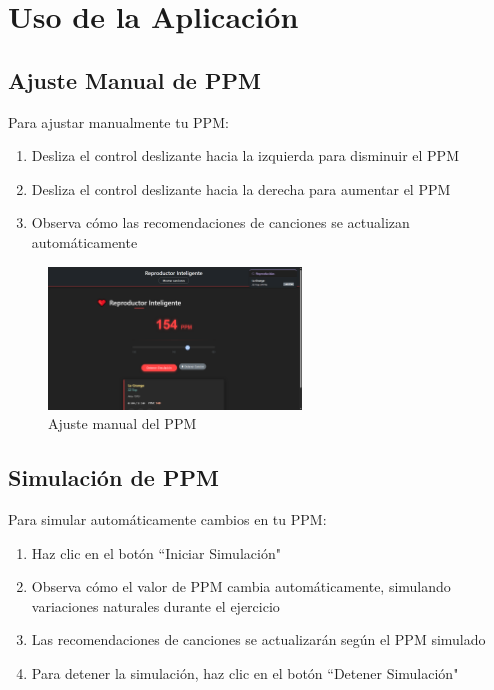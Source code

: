 \documentclass[a4paper,12pt]{article}
\begin{document}
\section{Uso de la Aplicación}

\subsection{Ajuste Manual de PPM}
Para ajustar manualmente tu PPM:
\begin{enumerate}
    \item Desliza el control deslizante hacia la izquierda para disminuir el PPM
    \item Desliza el control deslizante hacia la derecha para aumentar el PPM
    \item Observa cómo las recomendaciones de canciones se actualizan automáticamente
\end{enumerate}

 \begin{figure}[h]
     \centering
     \includegraphics[width=0.6\textwidth]{imagenes/ajuste_manual.png}
     \caption{Ajuste manual del PPM}
 \end{figure}

\subsection{Simulación de PPM}
Para simular automáticamente cambios en tu PPM:
\begin{enumerate}
    \item Haz clic en el botón ``Iniciar Simulación"
    \item Observa cómo el valor de PPM cambia automáticamente, simulando variaciones naturales durante el ejercicio
    \item Las recomendaciones de canciones se actualizarán según el PPM simulado
    \item Para detener la simulación, haz clic en el botón ``Detener Simulación"
\end{enumerate}
\end{document}
